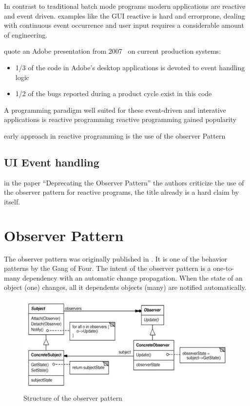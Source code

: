 \documentclass[acmsmall]{acmart}\settopmatter{printfolios=true,printccs=false,printacmref=false}
\begin{document}
	In contrast to traditional batch mode programs modern applications are reactive and event driven. 
	examples like the GUI 
	reactive is hard and errorprone, dealing with continuous event occurrence and user input requires a considerable amount of engineering.
	
	quote an Adobe presentation from 2007~\cite{parent2006possible} on current production systems:
	\begin{itemize}
		\item 1/3 of the code in Adobe’s desktop applications is devoted to event handling logic	
		\item 1/2 of the bugs reported during a product cycle exist in this code
	\end{itemize}


	
	A programming paradigm well suited for these event-driven and interative applications is reactive programming
	reactive programming gained popularity

	early approach in reactive programming is the use of the observer Pattern
	
	\subsection{UI Event handling}



	in the paper ``Deprecating the Observer Pattern'' the authors criticize the use of the observer pattern for reactive programs,
	the title already is a hard claim by itself.



\section{Observer Pattern}
	The observer pattern was originally published in \cite{Gamma:1995}. 
	It is one of the behavior patterns by the Gang of Four. 
	The intent of the observer pattern is a one-to-many dependency with an automatic change propagation.
	When the state of an object (one) changes, all it dependents objects (many) are notified automatically.

	\begin{figure}[H]
		\includegraphics{img/observer.jpg}
		\caption{Structure of the observer pattern~\cite{Gamma:1995}}
		\label{fig:observer}
	\end{figure}
\end{document}
